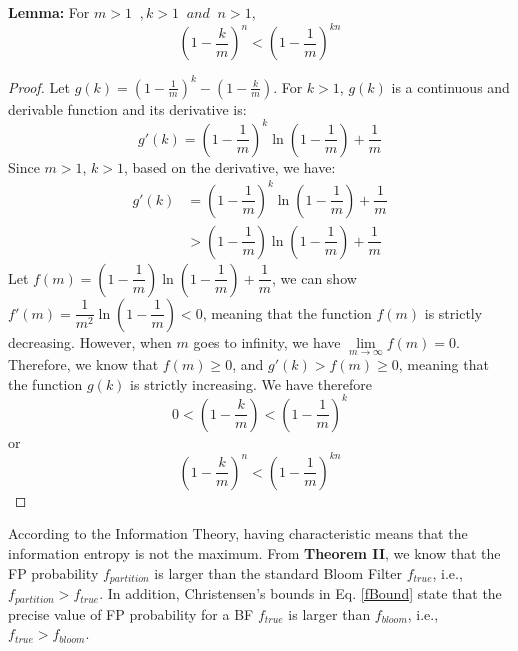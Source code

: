 \textbf{Lemma:} For $m > 1 \;\;,   k >1 \;\; and \;\; n > 1$,
\begin{equation}
\label{theorem1}
\left( 1-\dfrac{k}{m} \right)  ^n <
\left( 1-\dfrac{1}{m} \right)  ^{kn}
\end{equation}
\begin{proof}
Let $g(k)=( 1-\frac{1}{m} )  ^k- ( 1-\frac{k}{m} )$. For $k>1$, $g(k)$ is a continuous and derivable function and its derivative is:
\begin{equation}
g'(k)=\left( 1- \dfrac{1}{m}\right)^k \ln\left(1-\dfrac{1}{m}\right)+\dfrac{1}{m}
\end{equation}
Since $m > 1$, $k > 1$, based on the derivative, we have:
\begin{equation}
\begin{aligned}
g'(k) &=\left( 1- \dfrac{1}{m}\right)^k \ln\left(1-\dfrac{1}{m}\right)+\dfrac{1}{m} \\
&> \left( 1- \dfrac{1}{m}\right)\ln\left(1-\dfrac{1}{m}\right)+\dfrac{1}{m}
\end{aligned}
\end{equation}
Let $f(m)=\left( 1- \dfrac{1}{m}\right)\ln\left(1-\dfrac{1}{m}\right)+\dfrac{1}{m}$, we can show $f'(m) = \dfrac{1}{m^2} \ln\left(1-\dfrac{1}{m}\right)< 0$, meaning that the function $f(m)$ is strictly decreasing. However, when $m$ goes to infinity, we have $\lim\limits_{m \to \infty}  f(m) =  0$. Therefore, we know that $f(m) \geq 0$, and $g'(k) > f(m) \geq 0$, meaning that the function $g(k)$ is strictly increasing.
We have therefore 
\begin{equation}
0<\left( 1-\dfrac{k}{m} \right)   <
\left( 1-\dfrac{1}{m} \right)  ^k
\end{equation}
or 
\begin{equation}
\left( 1-\dfrac{k}{m} \right) ^n   <
\left( 1-\dfrac{1}{m} \right)  ^{kn}
\end{equation}
\end{proof}

According to the Information Theory, having characteristic means that the information entropy is not the maximum. From \textbf{Theorem II}, we know that the FP probability $f_{partition}$ is larger than the standard Bloom Filter  $f_{true}$, i.e., $f_{partition} > f_{true}$. In addition, Christensen’s bounds in Eq. \ref{fBound} state that the precise value of FP probability for a BF $f_{true}$ is larger than $f_{bloom}$, i.e., $f_{true} > f_{bloom}$.

